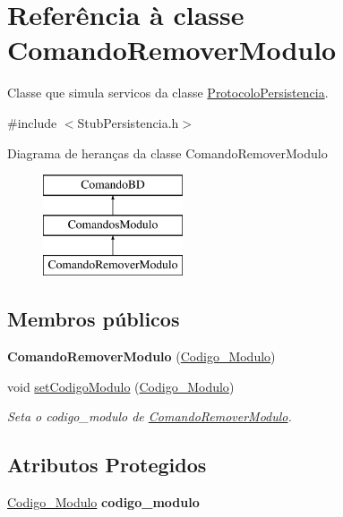 \hypertarget{class_comando_remover_modulo}{
\section{\-Referência à classe \-Comando\-Remover\-Modulo}
\label{class_comando_remover_modulo}
}


\-Classe que simula servicos da classe \hyperlink{class_protocolo_persistencia}{\-Protocolo\-Persistencia}.  




{\ttfamily \#include $<$\-Stub\-Persistencia.\-h$>$}

\-Diagrama de heranças da classe \-Comando\-Remover\-Modulo\begin{figure}[H]
\begin{center}
\leavevmode
\includegraphics[height=3.000000cm]{class_comando_remover_modulo}
\end{center}
\end{figure}
\subsection*{\-Membros públicos}
\begin{DoxyCompactItemize}
\item 
\hypertarget{class_comando_remover_modulo_a6a86e3827699c88bb138c0afa3c08bfa}{
{\bfseries \-Comando\-Remover\-Modulo} (\hyperlink{class_codigo___modulo}{\-Codigo\-\_\-\-Modulo})}
\label{class_comando_remover_modulo_a6a86e3827699c88bb138c0afa3c08bfa}

\item 
void \hyperlink{class_comando_remover_modulo_a8eb393d3bde9f6b6d2f733fdd5231c23}{set\-Codigo\-Modulo} (\hyperlink{class_codigo___modulo}{\-Codigo\-\_\-\-Modulo})
\begin{DoxyCompactList}\small\item\em \-Seta o codigo\-\_\-modulo de \hyperlink{class_comando_remover_modulo}{\-Comando\-Remover\-Modulo}. \end{DoxyCompactList}\end{DoxyCompactItemize}
\subsection*{\-Atributos \-Protegidos}
\begin{DoxyCompactItemize}
\item 
\hypertarget{class_comando_remover_modulo_a33aa86c3566113d75a2149b01ab8427f}{
\hyperlink{class_codigo___modulo}{\-Codigo\-\_\-\-Modulo} {\bfseries codigo\-\_\-modulo}}
\label{class_comando_remover_modulo_a33aa86c3566113d75a2149b01ab8427f}

\end{DoxyCompactItemize}


